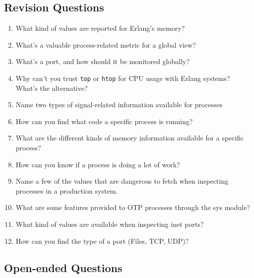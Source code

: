 \documentclass[11pt, oneside]{book}   	%
\newcommand{\app}[1]{\Verb`#1`}
\begin{document}
\subsection{Revision Questions}

\begin{enumerate}
	\item What kind of values are reported for Erlang's memory?
	\item What's a valuable process-related metric for a global view?
	\item What's a port, and how should it be monitored globally?
	\item Why can't you trust \app{top} or \app{htop} for CPU usage with Erlang systems? What's the alternative?
	\item Name two types of signal-related information available for processes
	\item How can you find what code a specific process is running?
	\item What are the different kinds of memory information available for a specific process?
	\item How can you know if a process is doing a lot of work?
	\item Name a few of the values that are dangerous to fetch when inspecting processes in a production system.
	\item What are some features provided to OTP processes through the sys module?
	\item What kind of values are available when inspecting inet ports?
	\item How can you find the type of a port (Files, TCP, UDP)?
\end{enumerate}

\subsection{Open-ended Questions}
\end{document}
